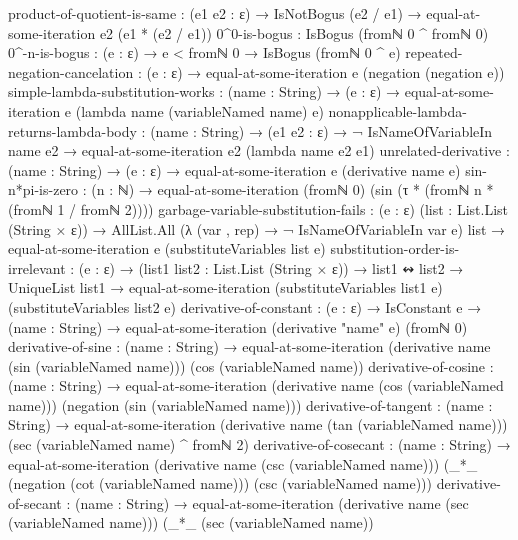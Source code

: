 \documentclass{report}
\begin{document}
\begin{code}
    product-of-quotient-is-same :
      (e1 e2 : ε) →
      IsNotBogus (e2 / e1) →
      equal-at-some-iteration e2 (e1 * (e2 / e1))
    0^0-is-bogus : IsBogus (fromℕ 0 ^ fromℕ 0)
    0^-n-is-bogus : (e : ε) → e < fromℕ 0 → IsBogus (fromℕ 0 ^ e)
    repeated-negation-cancelation :
      (e : ε) → equal-at-some-iteration e (negation (negation e))
    simple-lambda-substitution-works :
      (name : String) →
      (e : ε) →
      equal-at-some-iteration e (lambda name (variableNamed name) e)
    nonapplicable-lambda-returns-lambda-body :
      (name : String) →
      (e1 e2 : ε) →
      ¬ IsNameOfVariableIn name e2 →
      equal-at-some-iteration e2 (lambda name e2 e1)
    unrelated-derivative :
      (name : String) →
      (e : ε) →
      equal-at-some-iteration e (derivative name e)
    sin-n*pi-is-zero :
      (n : ℕ) →
      equal-at-some-iteration (fromℕ 0)
                              (sin (τ * (fromℕ n * (fromℕ 1 / fromℕ 2))))
    garbage-variable-substitution-fails :
      (e : ε)
      (list : List.List (String × ε)) →
      AllList.All (λ (var , rep) → ¬ IsNameOfVariableIn var e)
                  list →
      equal-at-some-iteration e (substituteVariables list e)
    substitution-order-is-irrelevant :
      (e : ε) →
      (list1 list2 : List.List (String × ε)) →
      list1 ↭ list2 →
      UniqueList list1 →
      equal-at-some-iteration (substituteVariables list1 e)
                              (substituteVariables list2 e)
    derivative-of-constant :
      (e : ε) →
      IsConstant e →
      (name : String) →
      equal-at-some-iteration (derivative "name" e) (fromℕ 0)
    derivative-of-sine :
      (name : String) →
      equal-at-some-iteration (derivative name (sin (variableNamed name)))
                              (cos (variableNamed name))
    derivative-of-cosine :
      (name : String) →
      equal-at-some-iteration (derivative name (cos (variableNamed name)))
                              (negation (sin (variableNamed name)))
    derivative-of-tangent :
      (name : String) →
      equal-at-some-iteration (derivative name (tan (variableNamed name)))
                              (sec (variableNamed name) ^ fromℕ 2)
    derivative-of-cosecant :
      (name : String) →
      equal-at-some-iteration (derivative name (csc (variableNamed name)))
                              (_*_ (negation (cot (variableNamed name)))
                                   (csc (variableNamed name)))
    derivative-of-secant :
      (name : String) →
      equal-at-some-iteration (derivative name (sec (variableNamed name)))
                              (_*_ (sec (variableNamed name))

\end{code}
\end{document}

